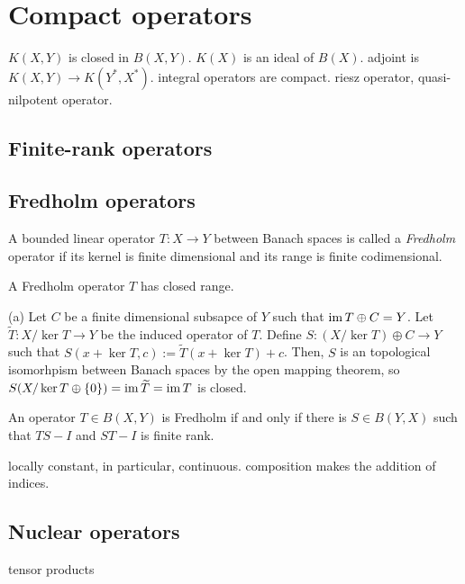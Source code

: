 \documentclass{../note}
\begin{document}
\chapter{Compact operators}

$K(X,Y)$ is closed in $B(X,Y)$.
$K(X)$ is an ideal of $B(X)$.
adjoint is $K(X,Y)\to K(Y^*,X^*)$.
integral operators are compact.
riesz operator, quasi-nilpotent operator.

\section{Finite-rank operators}
\section{Fredholm operators}

\begin{prb}
A bounded linear operator $T:X\to Y$ between Banach spaces is called a \emph{Fredholm} operator if its kernel is finite dimensional and its range is finite codimensional.
\begin{parts}
\item A Fredholm operator $T$ has closed range.
\end{parts}
\end{prb}
\begin{pf}
(a)
Let $C$ be a finite dimensional subsapce of $Y$ such that $\operatorname{im} T\oplus C=Y$.
Let $\tilde T:X/\ker T\to Y$ be the induced operator of $T$.
Define $S:(X/\ker T)\oplus C\to Y$ such that $S(x+\ker T,c):=\tilde T(x+\ker T)+c$.
Then, $S$ is an topological isomorhpism between Banach spaces by the open mapping theorem, so $S(X/\ker T\oplus\{0\})=\operatorname{im}\widetilde T=\operatorname{im} T$ is closed.
\end{pf}

\begin{prb}
An operator $T\in B(X,Y)$ is Fredholm if and only if there is $S\in B(Y,X)$ such that $TS-I$ and $ST-I$ is finite rank.
\end{prb}

\begin{prb}
locally constant, in particular, continuous.
composition makes the addition of indices.
\end{prb}

\section{Nuclear operators}
tensor products
\end{document}
